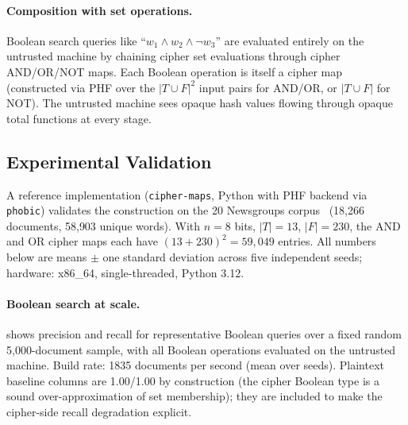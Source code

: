 \documentclass[11pt]{article}
\theoremstyle{definition}
\theoremstyle{plain}
\theoremstyle{remark}
\begin{document}
\paragraph{Composition with set operations.}
Boolean search queries like ``$w_1 \land w_2 \land \lnot w_3$'' are
evaluated entirely on the untrusted machine by chaining cipher set
evaluations through cipher AND/OR/NOT maps.
Each Boolean operation is itself a cipher map (constructed via PHF
over the $|T \cup F|^2$ input pairs for AND/OR, or $|T \cup F|$
for NOT).
The untrusted machine sees opaque hash values flowing through opaque
total functions at every stage.


\subsection{Experimental Validation}
\label{sec:evaluation}

A reference implementation (\texttt{cipher-maps}, Python with PHF
backend via \texttt{phobic}) validates the construction on the 20
Newsgroups corpus~\cite{lang1995newsweeder} (18{,}266 documents,
58{,}903 unique words).
With $n = 8$ bits, $|T| = 13$, $|F| = 230$, the AND and OR cipher
maps each have $(13 + 230)^2 = 59{,}049$ entries.
All numbers below are means $\pm$ one standard deviation across five
independent seeds; hardware: x86\_64, single-threaded, Python 3.12.

\paragraph{Boolean search at scale.}
 shows precision and recall for
representative Boolean queries over a fixed random 5{,}000-document
sample, with all Boolean operations evaluated on the untrusted
machine.
Build rate: 1835 documents per second (mean over seeds).
Plaintext baseline columns are 1.00/1.00 by construction (the cipher
Boolean type is a sound over-approximation of set membership); they
are included to make the cipher-side recall degradation explicit.
\end{document}
